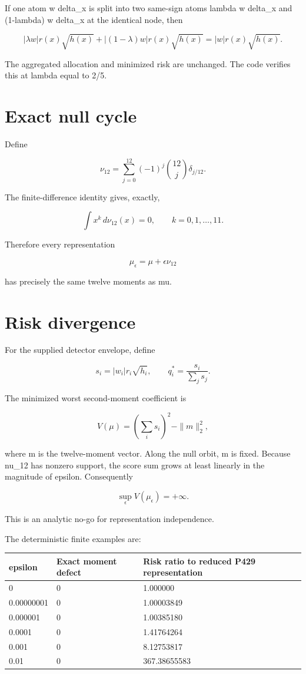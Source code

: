 \documentclass[11pt,a4paper,openany]{report}
\begin{document}
If one atom w delta\_x is split into two same-sign atoms lambda w delta\_x and (1-lambda) w delta\_x at the identical node, then

\[
|\lambda w|r(x)\sqrt{h(x)}
+|(1-\lambda)w|r(x)\sqrt{h(x)}
=|w|r(x)\sqrt{h(x)}.
\]

The aggregated allocation and minimized risk are unchanged. The code verifies this at lambda equal to 2/\allowbreak{}5.

\section{Exact null cycle}

Define

\[
\nu_{12}
=\sum_{j=0}^{12}(-1)^j\binom{12}{j}\delta_{j/12}.
\]

The finite-difference identity gives, exactly,

\[
\int x^k\,d\nu_{12}(x)=0,
\qquad k=0,1,\ldots,11.
\]

Therefore every representation

\[
\mu_\epsilon=\mu+\epsilon\nu_{12}
\]

has precisely the same twelve moments as mu.

\section{Risk divergence}

For the supplied detector envelope, define

\[
s_i=|w_i|r_i\sqrt{h_i},
\qquad
q_i^*=\frac{s_i}{\sum_js_j}.
\]

The minimized worst second-moment coefficient is

\[
V(\mu)=\left(\sum_i s_i\right)^2-\|m\|_2^2,
\]

where m is the twelve-moment vector. Along the null orbit, m is fixed. Because nu\_12 has nonzero support, the score sum grows at least linearly in the magnitude of epsilon. Consequently

\[
\sup_\epsilon V(\mu_\epsilon)=+\infty.
\]

This is an analytic no-go for representation independence.

The deterministic finite examples are:

\begin{center}
\begingroup\small
\setlength{\tabcolsep}{2.5pt}
\renewcommand{\arraystretch}{1.16}
\begin{longtable}{@{}p{}p{}p{}@{}}
\toprule
\textbf{epsilon} & \textbf{Exact moment defect} & \textbf{Risk ratio to reduced P429 representation} \\
\midrule
\endhead
0 & 0 & 1.000000 \\
0.00000001 & 0 & 1.00003849 \\
0.000001 & 0 & 1.00385180 \\
0.0001 & 0 & 1.41764264 \\
0.001 & 0 & 8.12753817 \\
0.01 & 0 & 367.38655583 \\
\bottomrule
\end{longtable}
\endgroup
\end{center}
\end{document}
